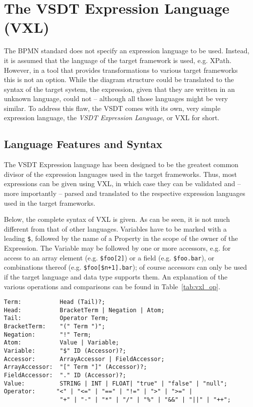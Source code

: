 
\chapter{The VSDT Expression Language (VXL)}
\label{sec:vxl}

The BPMN standard does not specify an expression language to be used. Instead, it is assumed that the language of the target framework is used, e.g. XPath.  However, in a tool that provides transformations to various target frameworks this is not an option. While the diagram structure could be translated to the syntax of the target system, the expression, given that they are written in an unknown language, could not -- although all those languages might be very similar.  To address this flaw, the VSDT comes with its own, very simple expression language, the \emph{VSDT Expression Language}, or VXL for short.


\section{Language Features and Syntax}

The VSDT Expression language has been designed to be the greatest common divisor of the expression languages used in the target frameworks.  Thus, most expressions can be given using VXL, in which case they can be validated and -- more importantly -- parsed and translated to the respective expression languages used in the target frameworks.

Below, the complete syntax of VXL is given. As can be seen, it is not much different from that of other languages. Variables have to be marked with a leading \verb|$|, followed by the name of a Property in the scope of the owner of the Expression. The Variable may be followed by one or more accessors, e.g. for access to an array element (e.g. \verb|$foo[2]|) or a field (e.g. \verb|$foo.bar|), or combinations thereof (e.g. \verb|$foo[$n+1].bar|); of course accessors can only be used if the target language and data type supports them. An explanation of the various operations and comparisons can be found in Table~\ref{tab:vxl_op}.

\begin{verbatim}
Term:           Head (Tail)?;
Head:           BracketTerm | Negation | Atom;
Tail:           Operator Term;
BracketTerm:    "(" Term ")";
Negation:       "!" Term;
Atom:           Value | Variable;
Variable:       "$" ID (Accessor)?;
Accessor:       ArrayAccessor | FieldAccessor;
ArrayAccessor:  "[" Term "]" (Accessor)?;
FieldAccessor:  "." ID (Accessor)?;
Value:          STRING | INT | FLOAT| "true" | "false" | "null";
Operator:      "<" | "<=" | "==" | "!=" | ">" | ">=" | 
                "+" | "-" | "*" | "/" | "%" | "&&" | "||" | "++";
\end{verbatim}


